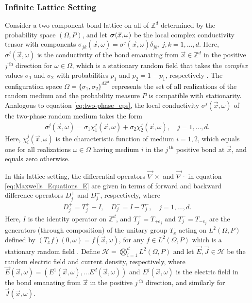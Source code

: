 \documentclass{cmslatex}
\newcommand\bsig{\mbox{\boldmath${\sigma}$}}
\begin{document}
\subsubsection{Infinite Lattice Setting}
\label{sec:Infinite_Lattice_Setting}
%
Consider a two-component bond lattice on all of $\mathbb{Z}^d$
determined by the probability space $(\Omega,P)$, and let
$\bsig(\vec{x},\omega)$ be the local complex conductivity tensor with
components $\sigma_{jk}(\vec{x},\omega)=\sigma^j(\vec{x},\omega)\delta_{jk}$, $j,k=1,\ldots,d$. Here,
$\sigma^j(\vec{x},\omega)$ is the conductivity of the bond emanating from 
$\vec{x}\in\mathbb{Z}^d$ in the positive $j^{\,\text{th}}$ direction for
$\omega\in\Omega$, which is a stationary random field that takes the \emph{complex} values
$\sigma_1$ and $\sigma_2$ with probabilities $p_1$ and $p_2=1-p_1$,
respectively \cite{Golden:CMP-467,Bruno:JSP-365}. The configuration
space $\Omega=\{\sigma_1,\sigma_2\}^{d\mathbb{Z}^d}$ represents the set of all
realizations of the random medium and the 
probability measure $P$ is compatible with stationarity. Analogous to
equation \eqref{eq:two-phase_eps}, the local conductivity
$\sigma^j(\vec{x},\omega)$ of the two-phase random medium takes the form
\cite{Golden:CMP-467} 
%
\begin{align}\label{eq:two-phase_sigma}
  \sigma^j(\vec{x},\omega)=\sigma_1\chi_1^j(\vec{x},\omega)+\sigma_2\chi_2^j(\vec{x},\omega), \quad j=1,\ldots,d.
\end{align}
%
Here, $\chi_i^j(\vec{x},\omega)$ is the characteristic function of medium
$i=1,2$, which equals one for all realizations $\omega\in\Omega$ having medium $i$
in the $j^{\,\text{th}}$ positive bond at $\vec{x}$, and equals zero
otherwise.




In this lattice setting, the differential operators $\vec{\nabla}\times$ and
$\vec{\nabla}\cdot$ in equation \eqref{eq:Maxwells_Equations_E} are given 
\cite{Golden:CMP-467,Bruno:JSP-365} in terms of forward and backward
difference operators $D_j^+$ and $D_j^-$, respectively, where
%
\begin{align}\label{eq:Difference_Operators}
  D_j^+=T_j^+-I, \quad D_j^-=I-T_j^-, \quad j=1,\ldots,d.
\end{align}
%
Here, $I$ is the identity operator on $\mathbb{Z}^d$, and 
$T_j^+=T_{+e_j}$ and $T_j^-=T_{-e_j}$ are the generators (through 
composition) of the unitary group $T_x$ acting on $L^2(\Omega,P)$ defined
by $(T_xf)(0,\omega)=f(\vec{x},\omega)$, for any $f\in L^2(\Omega,P)$
which is a stationary random field
\cite{Golden:CMP-467}. Define $\mathscr{H}=\bigotimes_{i=1}^dL^2(\Omega,P)$ and let
$\vec{E},\vec{J}\in \mathscr{H}$ be  
the random electric field and current density,
respectively, where $\vec{E}(\vec{x},\omega)=(E^1(\vec{x},\omega),\ldots
E^d(\vec{x},\omega))$ and $E^j(\vec{x},\omega)$ is the electric field in the
bond emanating from $\vec{x}$ in the positive $j^{\,\text{th}}$
direction, and similarly for $\vec{J}(\vec{x},\omega)$. 
\end{document}
